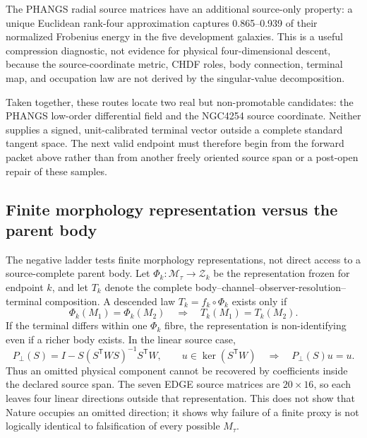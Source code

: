\documentclass[11pt]{article}
\begin{document}
The PHANGS radial source matrices have an additional source-only property: a
unique Euclidean rank-four approximation captures 0.865--0.939 of their
normalized Frobenius energy in the five development galaxies.  This is a
useful compression diagnostic, not evidence for physical four-dimensional
descent, because the source-coordinate metric, CHDF roles, body connection,
terminal map, and occupation law are not derived by the singular-value
decomposition.

Taken together, these routes locate two real but non-promotable candidates:
the PHANGS low-order differential field and the NGC4254 source coordinate.
Neither supplies a signed, unit-calibrated terminal vector outside a complete
standard tangent space.  The next valid endpoint must therefore begin from
the forward packet above rather than from another freely oriented source span
or a post-open repair of these samples.

\subsection{Finite morphology representation versus the parent body}
\label{sec:finite-representation-vs-body}

The negative ladder tests finite morphology representations, not direct access
to a source-complete parent body.  Let
\(\Phi_k:\mathcal M_\tau\rightarrow\mathcal Z_k\) be the representation frozen
for endpoint \(k\), and let \(T_k\) denote the complete
body--channel--observer-resolution--terminal composition.  A descended law
\(T_k=f_k\circ\Phi_k\) exists only if
\begin{equation}
\Phi_k(M_1)=\Phi_k(M_2)\quad\Longrightarrow\quad
T_k(M_1)=T_k(M_2).
\label{eq:fibre-sufficiency}
\end{equation}
If the terminal differs within one \(\Phi_k\) fibre, the representation is
non-identifying even if a richer body exists.  In the linear source case,
\begin{equation}
P_\perp(S)=I-S(S^{\mathsf T}WS)^{-1}S^{\mathsf T}W,\qquad
u\in\ker(S^{\mathsf T}W)\quad\Longrightarrow\quad P_\perp(S)u=u.
\label{eq:omitted-direction}
\end{equation}
Thus an omitted physical component cannot be recovered by coefficients inside
the declared source span.  The seven EDGE source matrices are \(20\times16\),
so each leaves four linear directions outside that representation.  This does
not show that Nature occupies an omitted direction; it shows why failure of a
finite proxy is not logically identical to falsification of every possible
\(M_\tau\).
\end{document}
